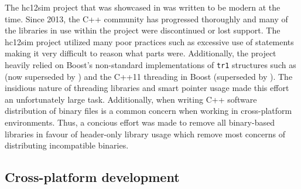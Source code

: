 The hc12sim project that was showcased in \cite{Brightwell2013} was written to be modern at the time. Since 2013, the C++ community has progressed thoroughly and many of the libraries in use within the project were discontinued or lost support. The hc12sim project utilized many poor practices such as excessive use of  statements making it very difficult to reason what parts were. Additionally, the project heavily relied on Boost's non-standard implementations of \verb|tr1| structures such as  \cite{Boost1.53.0:SmartPointers} (now superseded by  \cite{cppreference:shared-ptr}) and the C++11 threading in Boost \cite{Boost1.53.0:Thread} (superseded by  \cite{cppreference:thread}). The insidious nature of threading libraries and smart pointer usage made this effort an unfortunately large task. Additionally, when writing C++ software distribution of binary files is a common concern when working in cross-platform environments. Thus, a concious effort was made to remove all binary-based libraries in favour of header-only library usage which remove most concerns of distributing incompatible binaries.


\subsection{Cross-platform development}
\label{sec:lua:sec:cross-platform-development}


